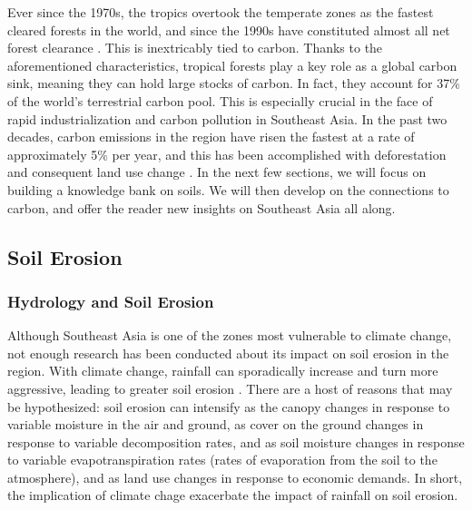 Ever since the 1970s, the tropics overtook the temperate zones as the fastest cleared forests in the world, and since the 1990s have constituted almost all net forest clearance \citep{houghton1996land}. This is inextricably tied to carbon. Thanks to the aforementioned characteristics, tropical forests play a key role as a global carbon sink, meaning they can hold large stocks of carbon. In fact, they account for 37\% of the world's terrestrial carbon pool. This is especially crucial in the face of rapid industrialization and carbon pollution in Southeast Asia. In the past two decades, carbon emissions in the region have risen the fastest at a rate of approximately 5\% per year, and this has been accomplished with deforestation and consequent land use change \citep{dixon1994carbon}. In the next few sections, we will focus on building a knowledge bank on soils. We will then develop on the connections to carbon, and offer the reader new insights on Southeast Asia all along.

\subsection{Soil Erosion}

\subsubsection{Hydrology and Soil Erosion}

Although Southeast Asia is one of the zones most vulnerable to climate change, not enough research has been conducted about its impact on soil erosion in the region. With climate change, rainfall can sporadically increase and turn more aggressive, leading to greater soil erosion \citep{chappell2007runoff}. There are a host of reasons that may be hypothesized: soil erosion can intensify as the canopy changes in response to variable moisture in the air and ground, as cover on the ground changes in response to variable decomposition rates, and as soil moisture changes in response to variable evapotranspiration rates (rates of evaporation from the soil to the atmosphere), and as land use changes in response to economic demands. In short, the implication of climate chage exacerbate the impact of rainfall on soil erosion. 

